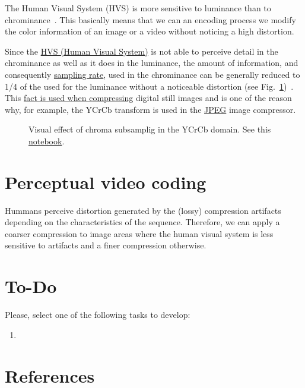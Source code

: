 The Human Visual System (HVS) is more sensitive to luminance than to
chrominance~\cite{vruiz__visual_redundancy}. This basically means that
we can an encoding process we modify the color information of an image
or a video without noticing a high distortion.

Since the \href{https://en.wikipedia.org/wiki/Visual_system}{HVS
  (Human Visual System)} is not able to perceive detail in the
chrominance as well as it does in the luminance, the amount of
information, and consequently
\href{https://en.wikipedia.org/wiki/Sampling_(signal_processing)}{sampling
  rate}, used in the chrominance can be generally reduced to 1/4 of
the used for the luminance without a noticeable distortion (see
Fig.~\ref{fig:san-diego_chroma_subsampled})~\cite{burger2016digital}. This
\href{https://en.wikipedia.org/wiki/Bandwidth_(computing)}{fact is
  used when compressing} digital still images and is one of the reason
why, for example, the $\text{YCrCb}$ transform is used in the
\href{https://en.wikipedia.org/wiki/JPEG}{JPEG} image compressor.


\begin{figure}
  \centering
  \caption{Visual effect of chroma subsamplig in the YCrCb domain. See
    this
    \href{https://github.com/Sistemas-Multimedia/Sistemas-Multimedia.github.io/blob/master/milestones/06-YUV_compression/chroma_subsampling.ipynb}{notebook}.}
  \label{fig:san-diego_chroma_subsampled}
\end{figure}

\section{Perceptual video coding}
Hummans perceive distortion generated by the (lossy) compression
artifacts depending on the characteristics of the sequence. Therefore,
we can apply a coarser compression to image areas where the human
visual system is less sensitive to artifacts and a finer compression
otherwise.

\section{To-Do}
Please, select one of the following tasks to develop:
\begin{enumerate}
\item
\end{enumerate}

\section{References}

\renewcommand{\addcontentsline}[3]{}%

